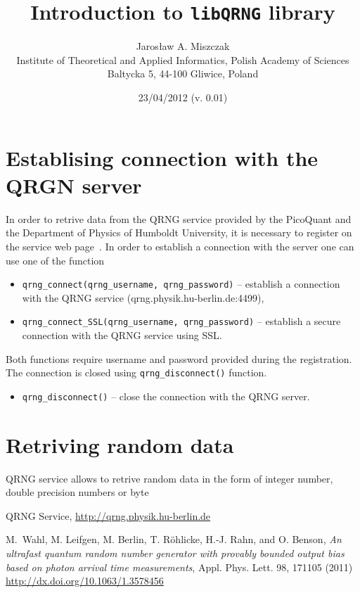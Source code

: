 \documentclass[a4paper,11pt]{article}
\title{Introduction to \texttt{libQRNG} library}
\author{Jaros{\l}aw A. Miszczak\\
Institute of Theoretical and Applied Informatics, Polish Academy of Sciences\\
Baltycka 5, 44-100 Gliwice, Poland}
\date{23/04/2012 (v. 0.01)}
\begin{document}
\maketitle

\section{Establising connection with the QRGN server}

In order to retrive data from the QRNG service provided by the PicoQuant and the
Department of Physics of Humboldt University, it is necessary to register on the
service web page~\cite{qrng-www}. In order to establish a connection with the server one can use
one of the function
\begin{itemize}
    \item \lstinline{qrng_connect(qrng_username, qrng_password)} -- establish a
      connection with the QRNG service (qrng.physik.hu-berlin.de:4499),

    \item \lstinline{qrng_connect_SSL(qrng_username, qrng_password)} --
      establish a secure connection with the QRNG service using SSL.
\end{itemize}
Both functions require username and password provided during the registration.
The connection is closed using \lstinline{qrng_disconnect()} function.
\begin{itemize}
	\item \lstinline{qrng_disconnect()} -- close the connection with the QRNG
	server.
\end{itemize}

\section{Retriving random data}
QRNG service allows to retrive random data in the form of integer number, double precision numbers or byte


\begin{thebibliography}{2}
     QRNG Service, \url{http://qrng.physik.hu-berlin.de}

     M.~Wahl, M. Leifgen, M. Berlin, T. R\"ohlicke,
       H.-J. Rahn, and O. Benson, \emph{An ultrafast quantum random number
       generator with provably bounded output bias based on photon arrival time
       measurements}, Appl. Phys. Lett. 98, 171105 (2011)
       \url{http://dx.doi.org/10.1063/1.3578456}
\end{thebibliography}
\end{document}
